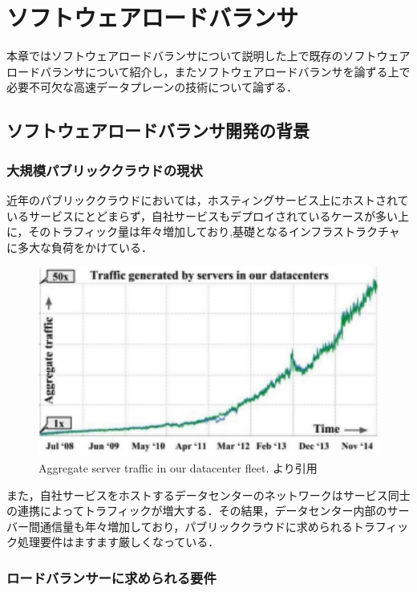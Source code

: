 \chapter{ソフトウェアロードバランサ}
\label{related}
本章ではソフトウェアロードバランサについて説明した上で既存のソフトウェアロードバランサについて紹介し，またソフトウェアロードバランサを論ずる上で必要不可欠な高速データプレーンの技術について論ずる．

\section{ソフトウェアロードバランサ開発の背景}

\subsection{大規模パブリッククラウドの現状}
近年のパブリッククラウドにおいては，ホスティングサービス上にホストされているサービスにとどまらず，自社サービスもデプロイされているケースが多い上に，そのトラフィック量は年々増加しており\cite{google_traffic},基礎となるインフラストラクチャに多大な負荷をかけている．

\begin{figure}
    \centering
    \includegraphics[width=12cm]{img/traffic.png}
    \caption{Aggregate server traffic in our datacenter fleet. \cite{google_traffic}より引用}
    \label{fig:google_traffic}
\end{figure}

また，自社サービスをホストするデータセンターのネットワークはサービス同士の連携によってトラフィックが増大する．その結果，データセンター内部のサーバー間通信量も年々増加しており\cite{facebook_traffic}，パブリッククラウドに求められるトラフィック処理要件はますます厳しくなっている．

\subsection{ロードバランサーに求められる要件}




